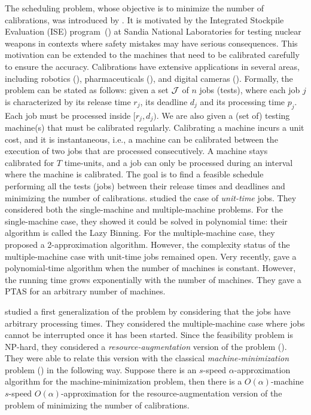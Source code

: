 The scheduling problem, whose objective is to minimize the number of calibrations, was introduced by \cite{bender2013efficient}. It is motivated by the Integrated Stockpile Evaluation (ISE) program~(\cite{ise}) at Sandia National Laboratories for testing nuclear weapons in contexts where safety mistakes may have serious consequences. This motivation can be extended to the machines that need to be calibrated carefully to ensure the accuracy. Calibrations have extensive applications in several areas, including robotics (\cite{bernhardt1993robot, evans1982method, nguyen2013new}), pharmaceuticals (\cite{forina1998multivariate, bansal2004qualification}), and digital cameras  (\cite{baer2005self, barton2006sensor, zhang2002method}).
Formally, the problem can be stated as follows:  given a set $\cal{J}$ of $n$ jobs (tests), where each job $j$ is characterized by its release time $r_j$, its deadline $d_j$ and its processing time $p_j$. Each job must be processed inside $[r_j,d_j)$. We are also given a (set of) testing machine(s) that must be calibrated regularly. Calibrating a machine incurs a unit cost, and it is instantaneous, i.e., a machine can be calibrated between the execution of two jobs that are processed consecutively. A machine stays calibrated for $T$ time-units, and a job can only be processed during an interval where the machine is calibrated. The goal is to find a feasible schedule performing all the tests (jobs) between their release times and deadlines and minimizing the number of calibrations. \cite{bender2013efficient} studied the case of \emph{unit-time} jobs. They considered both the single-machine and multiple-machine problems. For the single-machine case, they showed it could be solved in polynomial time: their algorithm is called the Lazy Binning. For the multiple-machine case, they proposed a 2-approximation algorithm. However, the complexity status of the multiple-machine case with unit-time jobs remained open. Very recently, \cite{ChenLL019} gave a polynomial-time algorithm when the number of machines is constant. However, the running time grows exponentially with the number of machines. They gave a PTAS for an arbitrary number of machines.

\cite{FinemanS15} studied a first generalization of the problem by considering that the jobs have arbitrary processing times. They considered the multiple-machine case where jobs cannot be interrupted once it has been started. Since the feasibility problem is NP-hard, they considered a {\em resource-augmentation}  version of the problem (\cite{KalyanasundaramP00}). They were able to relate this version with the classical {\em machine-minimization} problem (\cite{PhillipsSTW02}) in the following way. Suppose there is an $s$-speed $\alpha$-approximation algorithm for the machine-minimization problem, then there is a $O(\alpha)$-machine $s$-speed $O(\alpha)$-approximation for the resource-augmentation version of the problem of minimizing the number of calibrations.  

